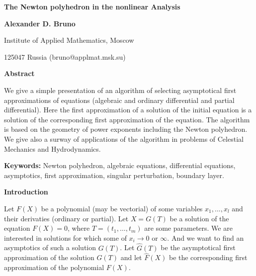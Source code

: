 
\setlength{\evensidemargin}{0in}
\setlength{\oddsidemargin}{0in}
\setlength{\textwidth}{16.cm}
\setlength{\textheight}{8.5in}
\setlength{\topmargin}{0in}
\setlength{\headheight}{0in}
\setlength{\headsep}{0in}
\setlength{\itemsep}{-\parsep}
\renewcommand{\topfraction}{.9}
\renewcommand{\textfraction}{.1}
\newcommand{\ol}{\setlength{\itemsep}{0pt.}\begin{enumerate}}
\newcommand{\eol}{\end{enumerete}\setlength{\itemsep}{-\parsep}}
\newcommand{\R}{{\rm{I\! R}}}
\newcommand{\Q}{{\rm Q\!\!\! l}}
\newcommand{\C}{{\rm{I\!\!\! C}}}
\newcommand{\N}{{\rm{I\! N}}}
\newcommand{\defi}{{\;\buildrel \rm def \over =}\;}


\Large
\centerline{\bf The Newton polyhedron in the nonlinear Analysis}

\centerline{\bf Alexander D. Bruno}
\centerline{Institute of Applied Mathematics, Moscow}
\centerline{125047 Russia (bruno@applmat.msk.su)}
\bigskip
\bigskip

\centerline{\bf Abstract}

We give a simple presentation of an algorithm of selecting asymptotical
first approximations of equations (algebraic and ordinary differential
and partial differential). Here the first approximation of a solution
of the initial equation is a solution of the corresponding first
approximation of the  equation. The algorithm
is based on the geometry of power exponents including the Newton
polyhedron. We give also a surway of applications of the algorithm in
problems of Celestial Mechanics and Hydrodynamics.

{\bf Keywords:} Newton polyhedron, algebraic equations, differential equations,
asymptotics, first approximation, singular perturbation, boundary layer.

\bigskip

\centerline{\bf Introduction}
\bigskip

Let $F(X)$ be a polynomial (may be vectorial) of some variables $x_1, ..., x_l$
and their derivaties (ordinary or partial). Let $X=G(T)$ be a solution of the
equation $F(X)=0$, where $T=(t_1,\dots, t_m)$ are some parameters. We are
interested in solutions for which some of $x_i\to 0$ or $\infty$. And we want
to find an asymptotics of such a solution $G(T)$.
Let $\hat G(T)$ be the asymptotical first approximation of the solution
$G(T)$ and let $\hat F(X)$ be the corresponding first approximation of the
polynomial $F(X)$.

